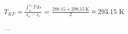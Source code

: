 \( T_{KF} = \frac{\int_{s_e}^{s_a} T \, ds}{s_a - s_e} \)  
= \( \frac{288.15 + 298.15 \, \text{K}}{2} \)  
≈ 293.15 K  

---